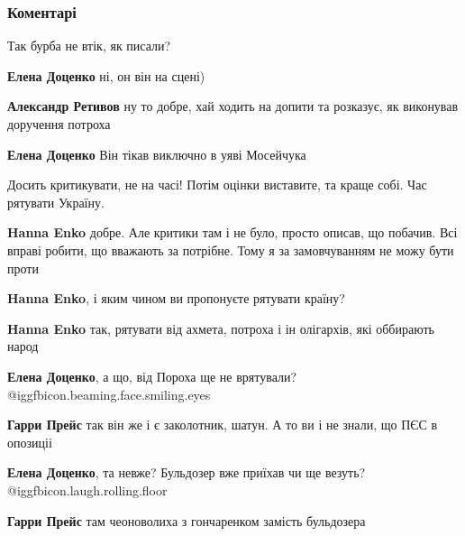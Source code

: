  
 
 
 
 
\subsubsection{Коментарі}

\begin{itemize} %
Так бурба не втік, як писали?

\begin{itemize} %
\textbf{Елена Доценко} ні, он він на сцені)

\textbf{Александр Ретивов} ну то добре, хай ходить на допити та розказує, як виконував доручення потроха

\textbf{Елена Доценко} Він тікав виключно в уяві Мосейчука
\end{itemize} %


Досить критикувати, не на часі! Потім оцінки виставите, та краще собі. Час
рятувати Україну.

\begin{itemize} %
\textbf{Hanna Enko} добре. Але критики там і не було, просто описав, що побачив. Всі вправі робити, що вважають за потрібне. Тому я за замовчуванням не можу бути проти

\textbf{Hanna Enko}, і яким чином ви пропонуєте рятувати країну?

\textbf{Hanna Enko} так, рятувати від ахмета, потроха і ін олігархів, які оббирають народ

\textbf{Елена Доценко}, а що, від Пороха ще не врятували?  @igg{fbicon.beaming.face.smiling.eyes} 

\textbf{Гарри Прейс} так він же і є заколотник, шатун. А то ви і не знали, що ПЄС в опозиціі

\textbf{Елена Доценко}, та невже?
Бульдозер вже приїхав чи ще везуть?  @igg{fbicon.laugh.rolling.floor} 

\textbf{Гарри Прейс} там чеоноволиха з гончаренком замість бульдозера


\end{itemize}
\end{itemize}

